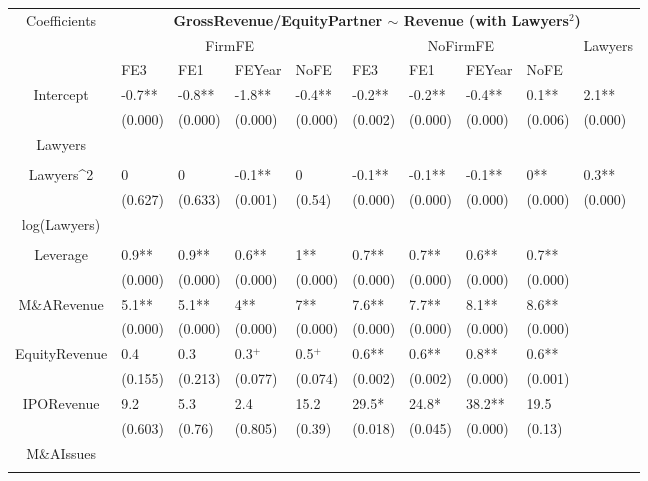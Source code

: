 \documentclass{article}
\begin{document}
\begin{table}[H]
\centering
\begin{tabular}{|clllllllll|}
\hline
\multirow{3}{*}{Coefficients} & \multicolumn{9}{c|}{\textbf{GrossRevenue/EquityPartner $\sim$ Revenue (with Lawyers$^2$)}} \\
\cline{2-10}
& \multicolumn{4}{c}{FirmFE} & \multicolumn{4}{c}{NoFirmFE} & \multirow{2}{*}{Lawyers} \\
\cline{2-9}
& FE3 & FE1 & FEYear & NoFE & FE3 & FE1 & FEYear & NoFE &  \\
\hline
 
Intercept & -0.7** & -0.8** & -1.8** & -0.4** & -0.2** & -0.2** & -0.4** & 0.1** & 2.1** \\ 
   & (0.000) & (0.000) & (0.000) & (0.000) & (0.002) & (0.000) & (0.000) & (0.006) & (0.000) \\ 
  Lawyers &  &  &  &  &  &  &  &  &  \\ 
   &  &  &  &  &  &  &  &  &  \\ 
  Lawyers^2 & 0 & 0 & -0.1** & 0 & -0.1** & -0.1** & -0.1** & 0** & 0.3** \\ 
   & (0.627) & (0.633) & (0.001) & (0.54) & (0.000) & (0.000) & (0.000) & (0.000) & (0.000) \\ 
  log(Lawyers) &  &  &  &  &  &  &  &  &  \\ 
   &  &  &  &  &  &  &  &  &  \\ 
  Leverage & 0.9** & 0.9** & 0.6** & 1** & 0.7** & 0.7** & 0.6** & 0.7** &  \\ 
   & (0.000) & (0.000) & (0.000) & (0.000) & (0.000) & (0.000) & (0.000) & (0.000) &  \\ 
  M\&ARevenue & 5.1** & 5.1** & 4** & 7** & 7.6** & 7.7** & 8.1** & 8.6** &  \\ 
   & (0.000) & (0.000) & (0.000) & (0.000) & (0.000) & (0.000) & (0.000) & (0.000) &  \\ 
  EquityRevenue & 0.4 & 0.3 & 0.3$^{+}$ & 0.5$^{+}$ & 0.6** & 0.6** & 0.8** & 0.6** &  \\ 
   & (0.155) & (0.213) & (0.077) & (0.074) & (0.002) & (0.002) & (0.000) & (0.001) &  \\ 
  IPORevenue & 9.2 & 5.3 & 2.4 & 15.2 & 29.5* & 24.8* & 38.2** & 19.5 &  \\ 
   & (0.603) & (0.76) & (0.805) & (0.39) & (0.018) & (0.045) & (0.000) & (0.13) &  \\ 
  M\&AIssues &  &  &  &  &  &  &  &  &  \\ 
   &  &  &  &  &  &  &  &  &  \\ 

\end{tabular}
\end{table}
\end{document}
